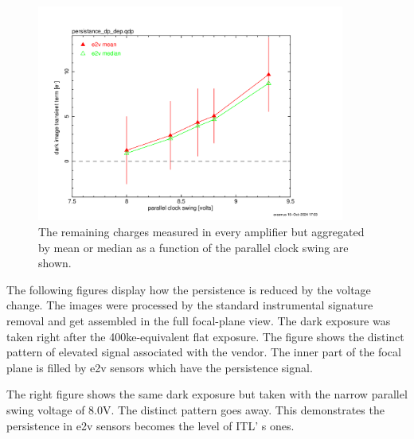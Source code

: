 \begin{figure}
\begin{centering}
\includegraphics[width=0.9\textwidth]{sections/figures/e2v_transient_dark_vs_dp.png}
\end{centering}
\caption{The remaining charges measured in every amplifier but
aggregated by mean or median as a function of the parallel clock swing
are shown.}
\end{figure}

The following figures display how the persistence is reduced by the
voltage change. The images were processed by the standard instrumental
signature removal and get assembled in the full focal-plane view. The
dark exposure was taken right after the 400ke-equivalent flat exposure.
The figure shows the distinct pattern of elevated signal associated with
the vendor. The inner part of the focal plane is filled by e2v sensors
which have the persistence signal.

The right figure shows the same dark exposure but taken with the narrow
parallel swing voltage of 8.0V. The distinct pattern goes away. This
demonstrates the persistence in e2v sensors becomes the level of
ITL' s ones.



